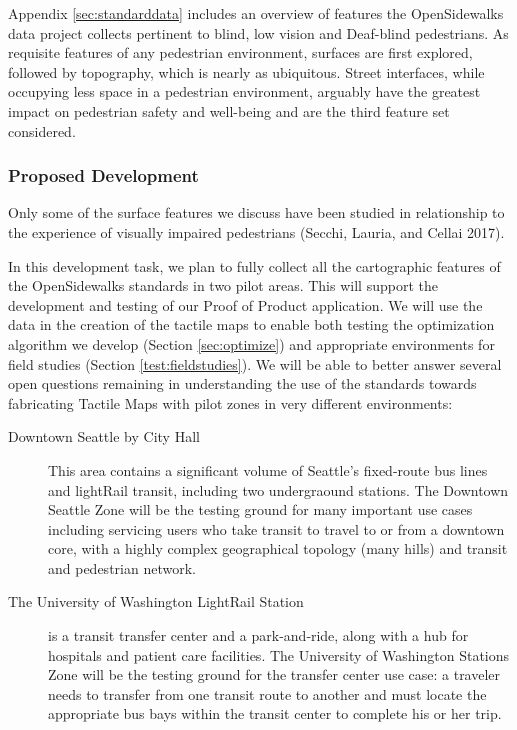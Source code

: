 Appendix \ref{sec:standarddata} includes an overview of features the OpenSidewalks data project collects pertinent to blind, low vision and Deaf-blind pedestrians. As requisite features of any pedestrian environment, surfaces are first explored, followed by topography, which is nearly as ubiquitous.  Street interfaces, while occupying less space in a pedestrian environment, arguably have the greatest impact on pedestrian safety and well-being and are the third feature set considered. 


\subsubsection{Proposed Development}
Only some of the surface features we discuss have been studied in relationship to the experience of visually impaired pedestrians (Secchi, Lauria, and Cellai 2017). 

In this development task, we plan to fully collect all the cartographic features of the OpenSidewalks standards in two pilot areas. This will 
support the development and testing of our Proof of Product application.
We will use the data in the creation of the tactile maps to enable both testing the optimization algorithm we develop (Section \ref{sec:optimize}) and appropriate environments for field studies (Section \ref{test:fieldstudies}). We will be able to better answer several open questions remaining in understanding the use of the standards towards fabricating Tactile Maps with pilot zones in very different environments:
\begin{description}
\item[Downtown Seattle by City Hall] This area contains a significant volume of Seattle's fixed-route bus lines and lightRail transit, including two undergraound stations. The Downtown Seattle Zone will be the testing ground for many important use cases including servicing 
users who take transit to travel to or from a downtown core, with a highly complex geographical topology (many hills) and transit and pedestrian network.
\item[The University of Washington LightRail Station] is a transit transfer center and a park‐and‐ride, along with a hub for hospitals and patient care facilities. The University of Washington Stations 
Zone will be the testing ground for the transfer center use case: a traveler needs to transfer from one transit route to another and must locate the appropriate bus bays within the transit center to complete his or her trip.
\end{description}

